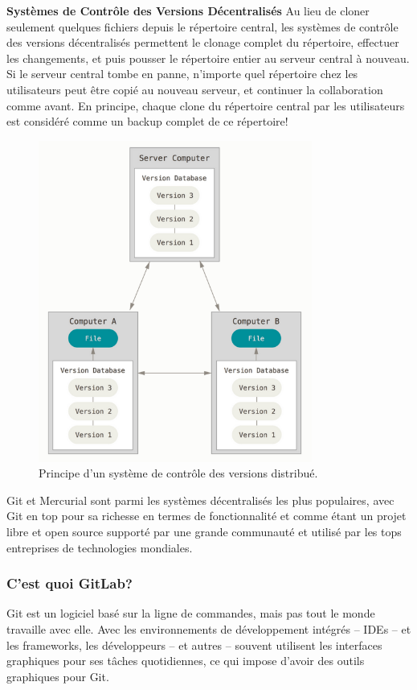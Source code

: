 \documentclass[a4paper,11pt,oneside]{report}
\begin{document}
\textbf{Systèmes de Contrôle des Versions Décentralisés} \newline
Au lieu de cloner seulement quelques fichiers depuis le répertoire central, les systèmes de contrôle des versions décentralisés permettent le clonage complet du répertoire, effectuer les changements, et puis pousser le répertoire entier au serveur central à nouveau. Si le serveur central tombe en panne, n’importe quel répertoire chez les utilisateurs peut être copié au nouveau serveur, et continuer la collaboration comme avant. En principe, chaque clone du répertoire central par les utilisateurs est considéré comme un backup complet de ce répertoire!

\begin{figure}[H]
    \centering
    \includegraphics[width=9cm]{distributed-scm.png}
    \caption{Principe d'un système de contrôle des versions distribué.}
    \label{fig:distributed-scm}
\end{figure}

Git et Mercurial sont parmi les systèmes décentralisés les plus populaires, avec Git en top pour sa richesse en termes de fonctionnalité et comme étant un projet libre et open source supporté par une grande communauté et utilisé par les tops entreprises de technologies mondiales.

\subsubsection{C’est quoi GitLab?}
Git est un logiciel basé sur la ligne de commandes, mais pas tout le monde travaille avec elle. Avec les environnements de développement intégrés – IDEs – et les frameworks, les développeurs – et autres – souvent utilisent les interfaces graphiques pour ses tâches quotidiennes, ce qui impose d’avoir des outils graphiques pour Git.
\newline
\end{document}
